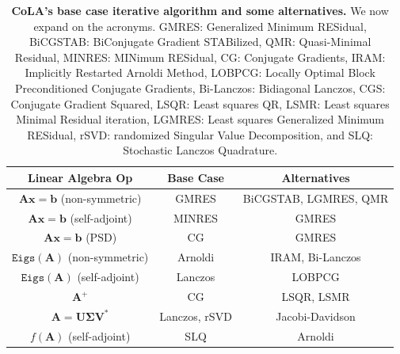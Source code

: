 \documentclass{article}
\newcommand{\mbf}[1]{{\boldsymbol{\mathbf{#1}}}}
\renewcommand{\bm}{\mbf}
\begin{document}
\begin{table}[ht]
  \centering
  \begin{tabular}{|c|c|c|}
    \hline
     \textbf{Linear Algebra Op}
     & \textbf{Base Case}
     & \textbf{Alternatives}
     \\
    \hline
    $\bm{A} \bm{x} = \bm{b}$ (non-symmetric)
    & GMRES
    & BiCGSTAB, LGMRES, QMR
    \\
    $\bm{A} \bm{x} = \bm{b}$ (self-adjoint)
    & MINRES
    & GMRES
    \\
    $\bm{A} \bm{x} = \bm{b}$ (PSD)
    & CG
    & GMRES
    \\
    $\texttt{Eigs}(\bm{A})$ (non-symmetric)
    & Arnoldi
    & IRAM, Bi-Lanczos
    \\
    $\texttt{Eigs}(\bm{A})$ (self-adjoint)
    & Lanczos
    & LOBPCG
    \\
    $\bm{A}^{+}$
    & CG
    & LSQR, LSMR
    \\
    $\bm{A} = \bm{U} \bm{\Sigma} \bm{V}^{*}$
    & Lanczos, rSVD
    & Jacobi-Davidson
    \\
    $f(\bm{A})$ (self-adjoint)
    & SLQ
    & Arnoldi
    \\
    \hline
  \end{tabular}
  \vspace{1mm}
  \caption{
  \textbf{CoLA's base case iterative algorithm and some alternatives.}
  We now expand on the acronyms.
  GMRES: Generalized Minimum RESidual,
  BiCGSTAB: BiConjugate Gradient STABilized,
  QMR: Quasi-Minimal Residual,
  MINRES: MINimum RESidual,
  CG: Conjugate Gradients,
  IRAM: Implicitly Restarted Arnoldi Method,
  LOBPCG: Locally Optimal Block Preconditioned Conjugate Gradients,
  Bi-Lanczos: Bidiagonal Lanczos,
  CGS: Conjugate Gradient Squared,
  LSQR: Least squares QR,
  LSMR: Least squares Minimal Residual iteration,
  LGMRES: Least squares Generalized Minimum RESidual,
  rSVD: randomized Singular Value Decomposition,
  and
  SLQ: Stochastic Lanczos Quadrature.
  }
  \label{tab:iterative}
\end{table}
\end{document}
